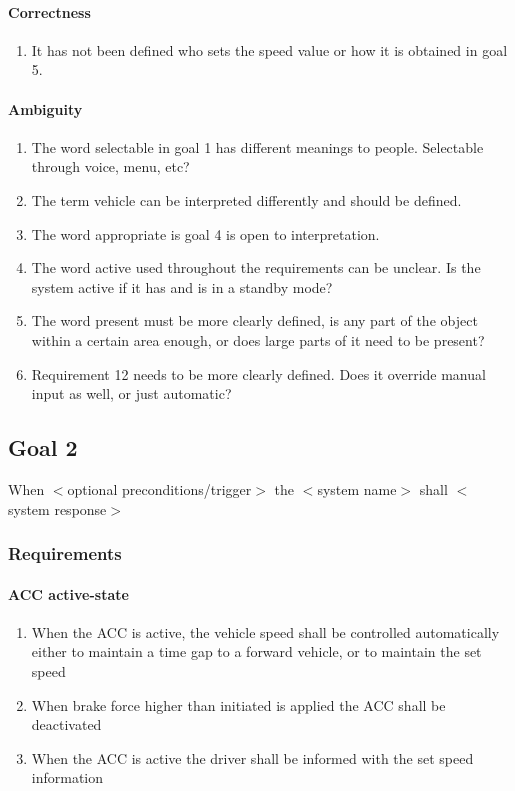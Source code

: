 \paragraph{Correctness}

\begin{enumerate}
    \item It has not been defined who sets the speed value or how it is obtained in goal 5.
\end{enumerate}

\paragraph{Ambiguity}

\begin{enumerate}
    \item The word selectable in goal 1 has different meanings to people. Selectable through voice, menu, etc?
    \item The term vehicle can be interpreted differently and should be defined.
    \item The word appropriate is goal 4 is open to interpretation.
    \item The word active used throughout the requirements can be unclear. Is the system active if it has and is in a standby mode?
    \item The word present must be more clearly defined, is any part of the object within a certain area enough, or does large parts of it need to be present? 
    \item Requirement 12  needs to be more clearly defined. Does it override manual input as well, or just automatic?
\end{enumerate}

\subsection{Goal 2}
When $<$optional preconditions/trigger$>$ the $<$system name$>$ shall $<$system response$>$

\subsubsection{Requirements}
\label{goal_2_requirements}

\paragraph{ACC active-state}
\begin{enumerate}
    \item When the ACC is active, the vehicle speed shall be controlled automatically either to maintain a time gap to a forward vehicle, or to maintain the set speed
    \item When brake force higher than initiated is applied the ACC shall be deactivated
    \item When the ACC is active the driver shall be informed with the set speed information
\end{enumerate}

